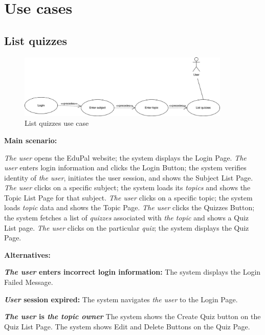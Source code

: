 \documentclass[
    english, %
]{VUMIFPSkursinis}
\begin{document}
\section{Use cases}

\subsection{List quizzes}

\begin{figure}[ht]
    \centering
    \includegraphics[width=0.9\textwidth]{../lab3diags/list.drawio Large.jpeg}
    \caption{List quizzes use case}
    \label{list-quizzes}
\end{figure}

\noindent\textbf{\fontsize{13}{15}\selectfont Main scenario:}

\textit{The user} opens the EduPal website; the system displays the Login Page. \textit{The user} enters login information and clicks the Login Button; the system verifies identity of \textit{the user}, initiates the user session, and shows the Subject List Page. \textit{The user} clicks on a specific subject; the system loads its \textit{topics} and shows the Topic List Page for that subject. \textit{The user} clicks on a specific topic; the system loads \textit{topic} data and shows the Topic Page. \textit{The user} clicks the Quizzes Button; the system fetches a list of \textit{quizzes} associated with \textit{the topic} and shows a Quiz List page. \textit{The user} clicks on the particular \textit{quiz}; the system displays the Quiz Page.

\noindent\textbf{\fontsize{13}{15}\selectfont Alternatives:}

\textbf{\textit{The user} enters incorrect login information:} The system displays the Login Failed Message.

\textbf{\textit{User} session expired:} The system navigates \textit{the user} to the Login Page.

\textbf{\textit{The user} is \textit{the topic owner}} The system shows the Create Quiz button on the Quiz List Page. The system shows Edit and Delete Buttons on the Quiz Page.
\end{document}
